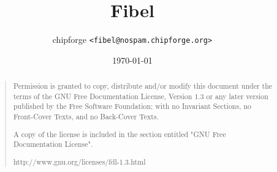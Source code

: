 \documentclass[10pt,a4paper]{report}
\title{Fibel}
\author{chipforge \texttt{<fibel@nospam.chipforge.org>}}
\date{\today}
\begin{document}
\maketitle
\setlength{\parindent}{0pt} %

\begin{abstract}
\begin{quote}
Permission is granted to copy, distribute and/or modify this
document under the terms of the GNU Free Documentation License,
Version 1.3 or any later version published by the Free Software
Foundation; with no Invariant Sections, no Front-Cover Texts, and
no Back-Cover Texts.

A copy of the license is included in the section entitled
"GNU Free Documentation License".

http://www.gnu.org/licenses/fdl-1.3.html
\end{quote}
\end{abstract}

\clearpage
\tableofcontents
\clearpage















\end{document}
